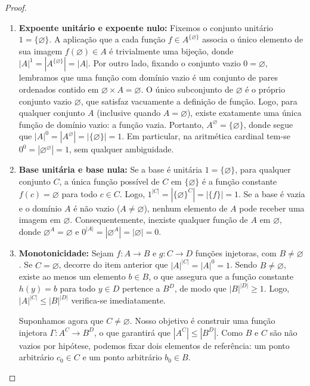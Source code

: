 \begin{proof}
\begin{enumerate}
        \item \textbf{Expoente unitário e expoente nulo:}
              Fixemos o conjunto unitário \(1 = \{\varnothing\}\). A aplicação que a cada função \(f \in A^{\{\varnothing\}}\) associa o único elemento de sua imagem \(f(\varnothing) \in A\) é trivialmente uma bijeção, donde \(|A|^1 = |A^{\{\varnothing\}}| = |A|\).
              Por outro lado, fixando o conjunto vazio \(0 = \varnothing\), lembramos que uma função com domínio vazio é um conjunto de pares ordenados contido em \(\varnothing \times A = \varnothing\). O único subconjunto de \(\varnothing\) é o próprio conjunto vazio \(\varnothing\), que satisfaz vacuamente a definição de função. Logo, para qualquer conjunto \(A\) (inclusive quando \(A = \varnothing\)), existe exatamente uma única função de domínio vazio: a função vazia. Portanto, \(A^\varnothing = \{\varnothing\}\), donde segue que \(|A|^0 = |A^\varnothing| = |\{\varnothing\}| = 1\). Em particular, na aritmética cardinal tem-se \(0^0 = |\varnothing^\varnothing| = 1\), sem qualquer ambiguidade.

        \item \textbf{Base unitária e base nula:}
              Se a base é unitária \(1 = \{\varnothing\}\), para qualquer conjunto \(C\), a única função possível de \(C\) em \(\{\varnothing\}\) é a função constante \(f(c) = \varnothing\) para todo \(c \in C\). Logo, \(1^{|C|} = |\{\varnothing\}^C| = |\{f\}| = 1\).
              Se a base é vazia e o domínio \(A\) é não vazio (\(A \neq \varnothing\)), nenhum elemento de \(A\) pode receber uma imagem em \(\varnothing\). Consequentemente, inexiste qualquer função de \(A\) em \(\varnothing\), donde \(\varnothing^A = \varnothing\) e \(0^{|A|} = |\varnothing^A| = |\varnothing| = 0\).

        \item \textbf{Monotonicidade:} Sejam \(f: A \to B\) e \(g: C \to D\) funções injetoras, com \(B \neq \varnothing\).
              Se \(C = \varnothing\), decorre do item anterior que \(|A|^{|C|} = |A|^0 = 1\). Sendo \(B \neq \varnothing\), existe ao menos um elemento \(b \in B\), o que assegura que a função constante \(h(y) = b\) para todo \(y \in D\) pertence a \(B^D\), de modo que \(|B|^{|D|} \geq 1\). Logo, \(|A|^{|C|} \leq |B|^{|D|}\) verifica-se imediatamente.

              Suponhamos agora que \(C \neq \varnothing\). Nosso objetivo é construir uma função injetora \(\Gamma: A^C \to B^D\), o que garantirá que \(|A^C| \leq |B^D|\). Como \(B\) e \(C\) são não vazios por hipótese, podemos fixar dois elementos de referência: um ponto arbitrário \(c_0 \in C\) e um ponto arbitrário \(b_0 \in B\).


\end{enumerate}
\end{proof}
